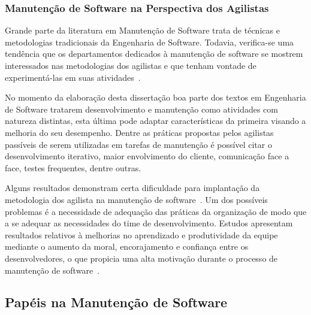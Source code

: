 \subsubsection{Manutenção de Software na Perspectiva dos Agilistas}
\label{sub:manutenção_de_software_com_método_dos_agilistas}

Grande parte da literatura em Manutenção de Software trata de técnicas e
metodologias tradicionais da Engenharia de Software. Todavia, verifica-se uma
tendência que os departamentos dedicados à manutenção de software se mostrem
interessados nas metodologias dos agilistas e que tenham vontade de
experimentá-las em suas atividades~\cite{Heeager2015}.

No momento da elaboração desta dissertação boa parte dos textos em Engenharia de
Software tratarem desenvolvimento e manutenção como atividades com natureza
distintas, esta última pode adaptar características da primeira visando a
melhoria do seu desempenho. Dentre as práticas propostas pelos agilistas
passíveis de serem utilizadas em tarefas de manutenção é possível citar o
desenvolvimento iterativo, maior envolvimento do cliente, comunicação face a
face, testes frequentes, dentre outras.

Alguns resultados demonstram certa dificuldade para implantação da metodologia
dos agilista na manutenção de software~\cite{1402140}. Um dos possíveis
problemas é a necessidade de adequação das práticas da organização de modo que a
se adequar as necessidades do time de desenvolvimento.  Estudos apresentam
resultados relativos à melhorias no aprendizado e produtividade da equipe
mediante o aumento da moral, encorajamento e confiança entre os desenvolvedores,
o que propicia uma alta motivação durante o processo de manutenção de
software~\cite{Choudhari:2014:EIM:2557833.2557845}.


\subsection{Papéis na Manutenção de Software}
\label{subsec:man_visao_geral_papeis_na_manutencao_de_software}

